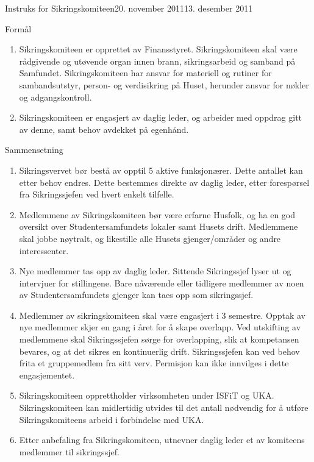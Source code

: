 \documentclass[../fsbok.tex]{subfiles}
\begin{document}
\begin{instruks}{Instruks for Sikringskomiteen}{20. november 2011}{13. desember 2011}
    \begin{instruksledd}{Formål}
        \begin{enumerate}
            \item  Sikringskomiteen er opprettet av Finansstyret. Sikringskomiteen skal
                være rådgivende og utøvende organ
                innen brann, sikringsarbeid og samband på Samfundet. Sikringskomiteen har ansvar
                for materiell og rutiner for sambandsutstyr, person-
                og verdisikring på Huset, herunder ansvar for nøkler og adgangskontroll.
            \item Sikringskomiteen er engasjert av daglig leder, og arbeider med oppdrag
                gitt av denne, samt behov avdekket
                på egenhånd.
        \end{enumerate}
    \end{instruksledd}

    \begin{instruksledd}{Sammensetning}
        \begin{enumerate}
            \item Sikringsvervet bør bestå av opptil 5 aktive funksjonærer. Dette antallet kan etter behov
                endres. Dette bestemmes
                direkte av daglig leder, etter forespørsel fra Sikringssjefen ved hvert enkelt
                tilfelle.
            \item Medlemmene av Sikringskomiteen bør være erfarne Husfolk, og ha en god oversikt over
                Studentersamfundets lokaler samt Husets drift. Medlemmene skal jobbe nøytralt, og
                likestille alle Husets
                gjenger/områder og andre interessenter.
            \item Nye medlemmer tas opp av daglig leder. Sittende Sikringssjef lyser ut og intervjuer
                for stillingene. Bare
                nåværende eller tidligere medlemmer av noen av Studentersamfundets gjenger kan taes
                opp som sikringssjef.
            \item Medlemmer av sikringskomiteen skal være engasjert i 3 semestre. Opptak av nye
                medlemmer skjer en gang i
                året for å skape overlapp. Ved utskifting av medlemmene skal Sikringssjefen sørge for
                overlapping, slik at
                kompetansen bevares, og at det sikres en kontinuerlig drift. Sikringssjefen kan ved
                behov frita et
                gruppemedlem fra sitt verv. Permisjon kan ikke innvilges i dette engasjementet.
	     \item Sikringskomiteen opprettholder virksomheten under ISFiT og UKA.
	        Sikringskomiteen kan midlertidig utvides til det antall nødvendig for å utføre
		Sikringskomiteens arbeid i forbindelse med UKA.
	     \item Etter anbefaling fra Sikringskomiteen, utnevner daglig leder et av komiteens
		medlemmer til sikringssjef.


\end{enumerate}
\end{instruksledd}
\end{instruks}
\end{document}

